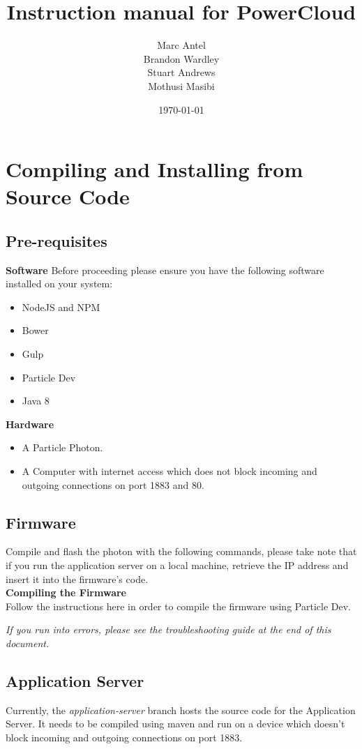 \documentclass[a4paper,10pt]{article}
\title{Instruction manual for PowerCloud}
\author{Marc Antel\\ Brandon Wardley\\ Stuart Andrews\\ Mothusi Masibi}
\date{\today}
\begin{document}
		\maketitle
		\newpage
	\section{Compiling and Installing from Source Code}
		\subsection{Pre-requisites}
			\textbf{Software}
			Before proceeding please ensure you have the following software installed on your system:
			\begin{itemize}
				\item NodeJS and NPM
				\item Bower
				\item Gulp
				\item Particle Dev
				\item Java 8
			\end{itemize}
			
			\textbf{Hardware}
			\begin{itemize}
				\item A Particle Photon.
				\item A Computer with internet access which does not block incoming and outgoing connections on port 1883 and 80.
			\end{itemize}
		\subsection{Firmware}
			Compile and flash the photon with the following commands, please take note that if you run the application server on a local machine, retrieve the IP address and insert it into the firmware's code.\\
			
			\textbf{Compiling the Firmware}\\
			
			Follow the instructions here in order to compile the firmware using Particle Dev.
			
			\textit{If you run into errors, please see the troubleshooting guide at the end of this document.}
			
		\subsection{Application Server}
			Currently, the \textit{application-server} branch hosts the source code for the Application Server. It needs to be compiled using maven and run on a device which doesn't block incoming and outgoing connections on port 1883.\\
			
\end{document}

